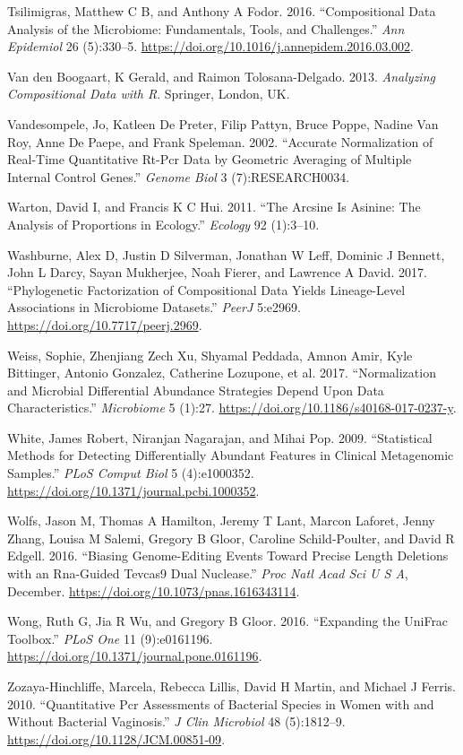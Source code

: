 \documentclass[onecolumn]{book}
\theoremstyle{definition}
\theoremstyle{definition}
\theoremstyle{definition}
\theoremstyle{remark}
\begin{document}
\leavevmode\hypertarget{ref-Tsilimigras:2016aa}{}%
Tsilimigras, Matthew C B, and Anthony A Fodor. 2016. ``Compositional
Data Analysis of the Microbiome: Fundamentals, Tools, and Challenges.''
\emph{Ann Epidemiol} 26 (5):330--5.
\url{https://doi.org/10.1016/j.annepidem.2016.03.002}.

\leavevmode\hypertarget{ref-van2013}{}%
Van den Boogaart, K Gerald, and Raimon Tolosana-Delgado. 2013.
\emph{Analyzing Compositional Data with R}. Springer, London, UK.

\leavevmode\hypertarget{ref-Vandesompele:2002aa}{}%
Vandesompele, Jo, Katleen De Preter, Filip Pattyn, Bruce Poppe, Nadine
Van Roy, Anne De Paepe, and Frank Speleman. 2002. ``Accurate
Normalization of Real-Time Quantitative Rt-Pcr Data by Geometric
Averaging of Multiple Internal Control Genes.'' \emph{Genome Biol} 3
(7):RESEARCH0034.

\leavevmode\hypertarget{ref-Warton:2011aa}{}%
Warton, David I, and Francis K C Hui. 2011. ``The Arcsine Is Asinine:
The Analysis of Proportions in Ecology.'' \emph{Ecology} 92 (1):3--10.

\leavevmode\hypertarget{ref-Washburne:2017aa}{}%
Washburne, Alex D, Justin D Silverman, Jonathan W Leff, Dominic J
Bennett, John L Darcy, Sayan Mukherjee, Noah Fierer, and Lawrence A
David. 2017. ``Phylogenetic Factorization of Compositional Data Yields
Lineage-Level Associations in Microbiome Datasets.'' \emph{PeerJ}
5:e2969. \url{https://doi.org/10.7717/peerj.2969}.

\leavevmode\hypertarget{ref-Weiss:2017aa}{}%
Weiss, Sophie, Zhenjiang Zech Xu, Shyamal Peddada, Amnon Amir, Kyle
Bittinger, Antonio Gonzalez, Catherine Lozupone, et al. 2017.
``Normalization and Microbial Differential Abundance Strategies Depend
Upon Data Characteristics.'' \emph{Microbiome} 5 (1):27.
\url{https://doi.org/10.1186/s40168-017-0237-y}.

\leavevmode\hypertarget{ref-White:2009}{}%
White, James Robert, Niranjan Nagarajan, and Mihai Pop. 2009.
``Statistical Methods for Detecting Differentially Abundant Features in
Clinical Metagenomic Samples.'' \emph{PLoS Comput Biol} 5 (4):e1000352.
\url{https://doi.org/10.1371/journal.pcbi.1000352}.

\leavevmode\hypertarget{ref-Wolfs:2016aa}{}%
Wolfs, Jason M, Thomas A Hamilton, Jeremy T Lant, Marcon Laforet, Jenny
Zhang, Louisa M Salemi, Gregory B Gloor, Caroline Schild-Poulter, and
David R Edgell. 2016. ``Biasing Genome-Editing Events Toward Precise
Length Deletions with an Rna-Guided Tevcas9 Dual Nuclease.'' \emph{Proc
Natl Acad Sci U S A}, December.
\url{https://doi.org/10.1073/pnas.1616343114}.

\leavevmode\hypertarget{ref-Wong:2016aa}{}%
Wong, Ruth G, Jia R Wu, and Gregory B Gloor. 2016. ``Expanding the
UniFrac Toolbox.'' \emph{PLoS One} 11 (9):e0161196.
\url{https://doi.org/10.1371/journal.pone.0161196}.

\leavevmode\hypertarget{ref-Zozaya:2010}{}%
Zozaya-Hinchliffe, Marcela, Rebecca Lillis, David H Martin, and Michael
J Ferris. 2010. ``Quantitative Pcr Assessments of Bacterial Species in
Women with and Without Bacterial Vaginosis.'' \emph{J Clin Microbiol} 48
(5):1812--9. \url{https://doi.org/10.1128/JCM.00851-09}.
\end{document}
